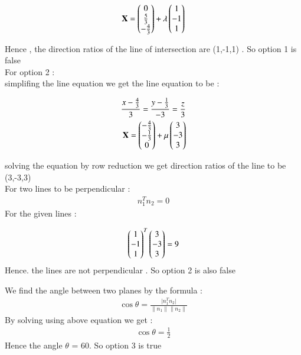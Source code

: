 \documentclass[journal]{IEEEtran}
\begin{document}
\begin{align}
  \mathbf{X} = \begin{pmatrix}0\\ \frac{5}{3} \\ -\frac{4}{3}\end{pmatrix} + \lambda\begin{pmatrix}1\\-1\\1\end{pmatrix}
\end{align}

Hence , the direction ratios of the line of intersection are (1,-1,1) . So option 1 is false\\

For option 2 :\\
simplifing the line equation we get the line equation to be :


\begin{align}
 \frac{x-\frac{4}{3}}{3} = \frac{y - \frac{1}{3}}{-3} = \frac{z}{3}\\
 \mathbf{X} = \begin{pmatrix}-\frac{4}{3}\\- \frac{1}{3}\\0\end{pmatrix} + \mu\begin{pmatrix}3\\-3\\3\end{pmatrix}
\end{align}


solving the equation by row reduction we get  direction ratios of the line to be (3,-3,3) \\
For two lines to be perpendicular :
\begin{align}
   n_1^{T}n_2 = 0
\end{align}
For the given lines :

\begin{align}
  \begin{pmatrix}1\\-1\\1\end{pmatrix}^{T} \begin{pmatrix}3 \\-3\\3\end{pmatrix} = 9 
\end{align}
Hence. the lines are not perpendicular . So option 2 is also false 

We find the angle between two planes by the formula :
\begin{align}
    \cos\theta = \frac{\lvert n_1^{T}n_2 \rvert}{\lVert n_1\rVert\lVert n_2\rVert}
\end{align}
By solving using above equation we get :
\begin{align}
    \cos\theta = \frac{1}{2}
\end{align}
Hence the angle $\theta$ = 60\degree . So option 3 is true 
\end{document}
